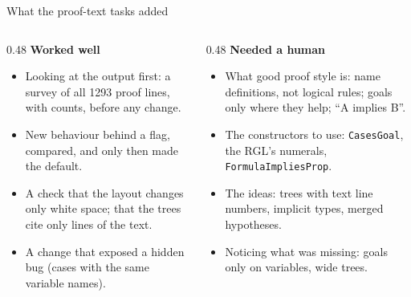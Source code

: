 \documentclass[10pt,aspectratio=169]{beamer}
\newcommand{\bad}[1]{\textcolor{warn}{#1}}
\newcommand{\ok}[1]{\textcolor{good}{#1}}
\begin{document}
\begin{frame}{What the proof-text tasks added}
  \begin{columns}[T]
    \begin{column}{0.48\textwidth}
      \ok{\textbf{Worked well}}
      \begin{itemize}\small
        \item Looking at the output first: a survey of all 1293 proof lines, with counts,
              before any change.
        \item New behaviour behind a flag, compared, and only then made the default.
        \item A check that the layout changes only white space; that the trees cite only
              lines of the text.
        \item A change that exposed a hidden bug (cases with the same variable names).
      \end{itemize}
    \end{column}
    \begin{column}{0.48\textwidth}
      \bad{\textbf{Needed a human}}
      \begin{itemize}\small
        \item What good proof style is: name definitions, not logical rules; goals only
              where they help; ``A implies B''.
        \item The constructors to use: \texttt{CasesGoal}, the RGL's numerals,
              \texttt{FormulaImpliesProp}.
        \item The ideas: trees with text line numbers, implicit types, merged hypotheses.
        \item Noticing what was missing: goals only on variables, wide trees.
      \end{itemize}
    \end{column}
  \end{columns}
\end{frame}
\end{document}
